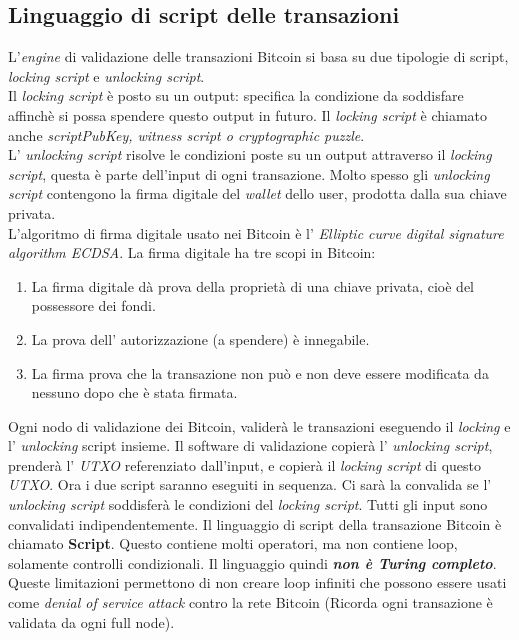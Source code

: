 \subsection{Linguaggio di script delle transazioni}
L'\textit{engine} di validazione delle transazioni Bitcoin si basa su due tipologie di script, \textit{locking script} e \textit{unlocking script}.\\
Il \textit{locking script}  \`e posto su un output: specifica la condizione da soddisfare affinch\`e si possa spendere questo output in futuro. Il \textit{locking script} \`e chiamato anche \textit{scriptPubKey, witness script o cryptographic puzzle}.\\
L' \textit{unlocking script} risolve le condizioni poste su un output attraverso il \textit{locking script}, questa \`e parte dell'input di ogni transazione. Molto spesso gli \textit{unlocking script} contengono la firma digitale del \textit{wallet} dello user, prodotta dalla sua chiave privata.\\
L'algoritmo di firma digitale usato nei Bitcoin \`e l' \textit{Elliptic curve digital signature algorithm ECDSA}. La firma digitale ha tre scopi in Bitcoin:
\begin{enumerate}
\item La firma digitale d\`a prova della propriet\`a di una chiave privata, cio\`e del possessore dei fondi.
\item La prova dell' autorizzazione (a spendere) \`e innegabile.
\item La firma prova che la transazione non pu\`o e non deve essere modificata da nessuno dopo che \`e stata firmata.
\end{enumerate}
Ogni nodo di validazione dei Bitcoin, valider\`a le transazioni eseguendo il \textit{locking} e l' \textit{unlocking} script insieme. Il software di validazione copier\`a l' \textit{unlocking script}, prender\`a l' \textit{UTXO} referenziato dall'input, e copier\`a il  \textit{locking script} di questo \textit{UTXO}. Ora i due script saranno eseguiti in sequenza. Ci sar\`a la convalida se l' \textit{unlocking script } soddisfer\`a le condizioni del \textit{locking script}. Tutti gli input sono convalidati indipendentemente.
Il linguaggio di script della transazione Bitcoin \`e chiamato \textbf{Script}.
Questo contiene molti operatori, ma non contiene loop, solamente controlli condizionali. Il linguaggio quindi \textbf{\textit{non \`e Turing completo}}. Queste limitazioni permettono di non creare loop infiniti che possono essere usati come \textit{denial of service attack} contro la rete Bitcoin (Ricorda ogni transazione \`e validata da ogni full node).

